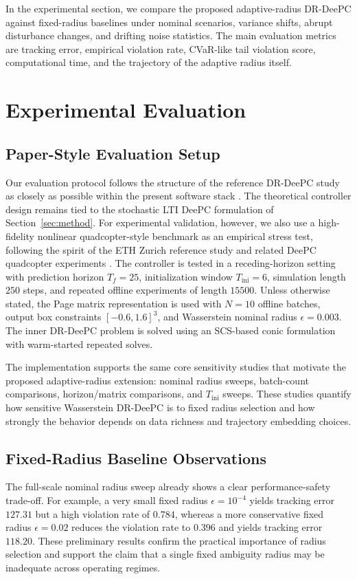 \documentclass[conference]{IEEEtran}
\begin{document}
In the experimental section, we compare the proposed adaptive-radius DR-DeePC against fixed-radius baselines under nominal scenarios, variance shifts, abrupt disturbance changes, and drifting noise statistics. The main evaluation metrics are tracking error, empirical violation rate, CVaR-like tail violation score, computational time, and the trajectory of the adaptive radius itself.

\section{Experimental Evaluation}
\label{sec:experiments}

\subsection{Paper-Style Evaluation Setup}
Our evaluation protocol follows the structure of the reference DR-DeePC study as closely as possible within the present software stack \cite{Coulson2022DRCCDeePC}. The theoretical controller design remains tied to the stochastic LTI DeePC formulation of Section~\ref{sec:method}. For experimental validation, however, we also use a high-fidelity nonlinear quadcopter-style benchmark as an empirical stress test, following the spirit of the ETH Zurich reference study and related DeePC quadcopter experiments \cite{Elokda2021Quadcopter}. The controller is tested in a receding-horizon setting with prediction horizon $T_f = 25$, initialization window $T_{\mathrm{ini}} = 6$, simulation length $250$ steps, and repeated offline experiments of length $15500$. Unless otherwise stated, the Page matrix representation is used with $N=10$ offline batches, output box constraints $[-0.6,1.6]^3$, and Wasserstein nominal radius $\epsilon=0.003$. The inner DR-DeePC problem is solved using an SCS-based conic formulation with warm-started repeated solves.

The implementation supports the same core sensitivity studies that motivate the proposed adaptive-radius extension: nominal radius sweeps, batch-count comparisons, horizon/matrix comparisons, and $T_{\mathrm{ini}}$ sweeps. These studies quantify how sensitive Wasserstein DR-DeePC is to fixed radius selection and how strongly the behavior depends on data richness and trajectory embedding choices.

\subsection{Fixed-Radius Baseline Observations}
The full-scale nominal radius sweep already shows a clear performance-safety trade-off. For example, a very small fixed radius $\epsilon=10^{-4}$ yields tracking error $127.31$ but a high violation rate of $0.784$, whereas a more conservative fixed radius $\epsilon=0.02$ reduces the violation rate to $0.396$ and yields tracking error $118.20$. These preliminary results confirm the practical importance of radius selection and support the claim that a single fixed ambiguity radius may be inadequate across operating regimes.
\end{document}
